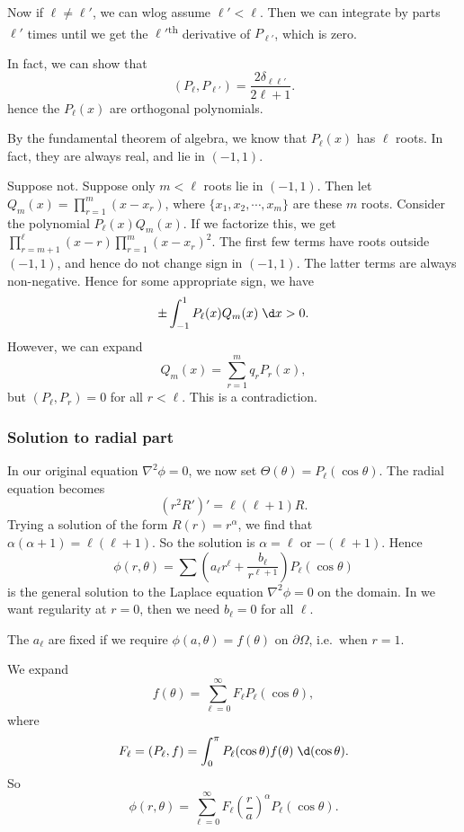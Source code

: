 \documentclass[a4paper]{article}
\begin{document}
Now if $\ell \not= \ell'$, we can wlog assume $\ell' < \ell$. Then we can integrate by parts $\ell'$ times until we get the $\ell'$\textsuperscript{th} derivative of $P_{\ell'}$, which is zero.

In fact, we can show that
\[
  (P_\ell, P_{\ell'}) = \frac{2\delta_{\ell\ell'}}{2\ell + 1}.
\]
hence the $P_\ell(x)$ are orthogonal polynomials.

By the fundamental theorem of algebra, we know that $P_\ell(x)$ has $\ell$ roots. In fact, they are always real, and lie in $(-1, 1)$.

Suppose not. Suppose only $m < \ell$ roots lie in $(-1, 1)$. Then let $Q_m(x) = \prod_{r = 1}^m (x - x_r)$, where $\{x_1, x_2, \cdots, x_m\}$ are these $m$ roots. Consider the polynomial $P_{\ell}(x)Q_m(x)$. If we factorize this, we get $\prod_{r = m + 1}^\ell (x - r)\prod_{r = 1}^m (x - x_r)^2$. The first few terms have roots outside $(-1, 1)$, and hence do not change sign in $(-1, 1)$. The latter terms are always non-negative. Hence for some appropriate sign, we have
\[
  \pm\int_{-1}^1 P_\ell(x) Q_m(x) \;\d x > 0.
\]
However, we can expand
\[
  Q_m(x) = \sum_{r = 1}^m q_r P_r(x),
\]
but $(P_\ell, P_r) = 0$ for all $r < \ell$. This is a contradiction.

\subsubsection{Solution to radial part}
In our original equation $\nabla^2 \phi = 0$, we now set $\Theta(\theta) = P_\ell(\cos \theta)$. The radial equation becomes
\[
  (r^2 R')' = \ell(\ell + 1)R.
\]
Trying a solution of the form $R(r) = r^\alpha$, we find that $\alpha(\alpha + 1) = \ell(\ell + 1)$. So the solution is $\alpha = \ell$ or $-(\ell + 1)$. Hence
\[
  \phi(r, \theta) = \sum \left(a_\ell r^\ell + \frac{b_\ell}{r^{\ell + 1}}\right) P_\ell(\cos \theta)
\]
is the general solution to the Laplace equation $\nabla^2 \phi = 0$ on the domain. In we want regularity at $r = 0$, then we need $b_\ell = 0$ for all $\ell$.

The $a_\ell$ are fixed if we require $\phi(a, \theta) = f(\theta)$ on $\partial \Omega$, i.e.\ when $r = 1$.

We expand
\[
  f(\theta) = \sum_{\ell = 0}^\infty F_\ell P_\ell(\cos \theta),
\]
where
\[
  F_\ell = (P_\ell, f) = \int_0^\pi P_{\ell}(\cos \theta) f(\theta) \;\d (\cos \theta).
\]
So
\[
  \phi(r, \theta) = \sum_{\ell = 0}^\infty F_\ell \left(\frac{r}{a}\right)^\alpha P_\ell(\cos \theta).
\]
\end{document}
